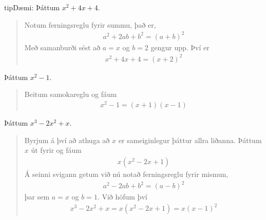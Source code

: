 \documentclass[a4paper,10pt,icelandic]{sphinxmanual}
\begin{document}
\begin{sphinxadmonition}{tip}{Dæmi:}
 Þáttum \(x^2+4x+4\).
\begin{quote}

Notum ferningsreglu fyrir summu, það er,
\begin{equation*}
\begin{split}a^2+2ab+b^2=(a+b)^2\end{split}
\end{equation*}
Með samanburði sést að \(a=x\) og \(b=2\) gengur upp. Því er
\begin{equation*}
\begin{split}x^2+4x+4=(x+2)^2\end{split}
\end{equation*}\end{quote}

 Þáttum \(x^2-1\).
\begin{quote}

Beitum samokareglu og fáum
\begin{equation*}
\begin{split}x^2-1 =(x+1)(x-1)\end{split}
\end{equation*}\end{quote}

 Þáttum \(x^3-2x^2+x\).
\begin{quote}

Byrjum á því að athuga að \(x\) er sameiginlegur þáttur allra liðanna. Þáttum \(x\) út fyrir og fáum
\begin{equation*}
\begin{split}x(x^2-2x+1)\end{split}
\end{equation*}
Á seinni svigann getum við nú notað ferningsreglu fyrir mismun,
\begin{equation*}
\begin{split}a^2-2ab+b^2=(a-b)^2\end{split}
\end{equation*}
þar sem \(a=x\) og \(b=1\). Við höfum því
\begin{equation*}
\begin{split}x^3 - 2x^2 + x = x(x^2 - 2x + 1) = x(x-1)^2\end{split}
\end{equation*}\end{quote}
\end{sphinxadmonition}
\end{document}

